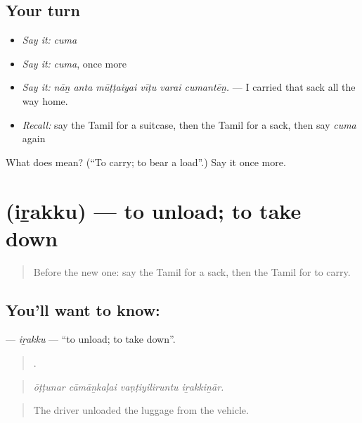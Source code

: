 \subsection*{Your turn}
\begin{itemize}
\raggedright
  \item \emph{Say it:} \emph{cuma}
  \item \emph{Say it:} \emph{cuma}, once more
  \item \emph{Say it:} \emph{nāṉ anta mūṭṭaiyai vīṭu varai cumantēṉ.} — I carried that sack all the way home.
  \item \emph{Recall:} say the Tamil for a suitcase, then the Tamil for a sack, then say \emph{cuma} again
\end{itemize}

\begin{tcolorbox}[breakable,colback=teal!4,colframe=teal!35!black,title={Before you move on}]
What does  mean? (\textquotedblleft{}To carry; to bear a load\textquotedblright{}.) Say it once more.
\end{tcolorbox}
\section[\texorpdfstring{\ta{இறக்கு} (iṟakku)}{இறக்கு (iṟakku)}]{ (iṟakku) — to unload; to take down}

\label{lesson:TA-C402-irakku}



\begin{quote}
Before the new one: say the Tamil for a sack, then the Tamil for to carry.
\end{quote}

\subsection*{You'll want to know: }
\textbf{} — \emph{iṟakku} — \textquotedblleft{}to unload; to take down\textquotedblright{}.

\begin{quote}
   .
\end{quote}

\begin{quote}
\emph{ōṭṭunar cāmāṉkaḷai vaṇṭiyiliruntu iṟakkiṉār.}
\end{quote}

\begin{quote}
The driver unloaded the luggage from the vehicle.
\end{quote}

